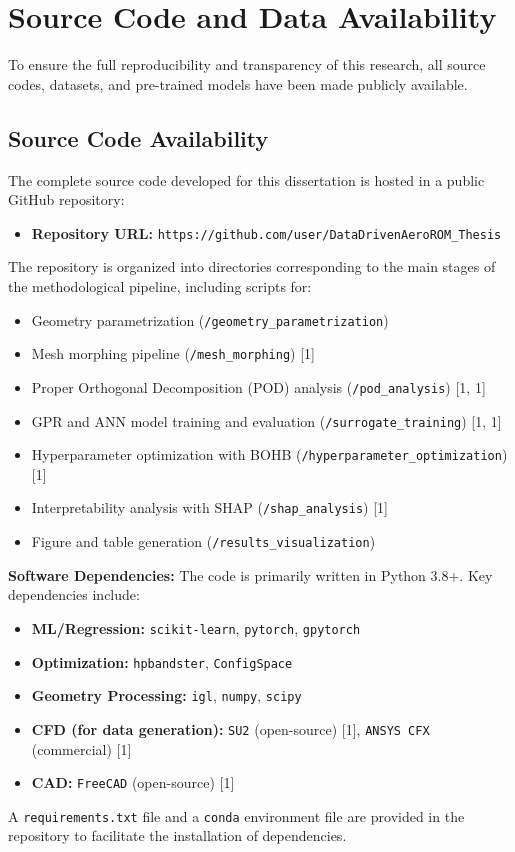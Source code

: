 \documentclass[dsc, EN]{ufabcFHZh}
\begin{document}
\chapter{Source Code and Data Availability}
\label{app:code_data}

To ensure the full reproducibility and transparency of this research, all source codes, datasets, and pre-trained models have been made publicly available.

\section{Source Code Availability}
\label{sec:code_availability}

The complete source code developed for this dissertation is hosted in a public GitHub repository:
\begin{itemize}
    \item \textbf{Repository URL:} \texttt{https://github.com/user/DataDrivenAeroROM\_Thesis}
\end{itemize}
The repository is organized into directories corresponding to the main stages of the methodological pipeline, including scripts for:
\begin{itemize}
    \item Geometry parametrization (\texttt{/geometry\_parametrization})
    \item Mesh morphing pipeline (\texttt{/mesh\_morphing}) {[1]}
    \item Proper Orthogonal Decomposition (POD) analysis (\texttt{/pod\_analysis}) {[1, 1]}
    \item GPR and ANN model training and evaluation (\texttt{/surrogate\_training}) {[1, 1]}
    \item Hyperparameter optimization with BOHB (\texttt{/hyperparameter\_optimization}) {[1]}
    \item Interpretability analysis with SHAP (\texttt{/shap\_analysis}) {[1]}
    \item Figure and table generation (\texttt{/results\_visualization})
\end{itemize}

\noindent\textbf{Software Dependencies:}
The code is primarily written in Python 3.8+. Key dependencies include:
\begin{itemize}
    \item \textbf{ML/Regression:} \texttt{scikit-learn}, \texttt{pytorch}, \texttt{gpytorch}
    \item \textbf{Optimization:} \texttt{hpbandster}, \texttt{ConfigSpace}
    \item \textbf{Geometry Processing:} \texttt{igl}, \texttt{numpy}, \texttt{scipy}
    \item \textbf{CFD (for data generation):} \texttt{SU2} (open-source) {[1]}, \texttt{ANSYS CFX} (commercial) {[1]}
    \item \textbf{CAD:} \texttt{FreeCAD} (open-source) {[1]}
\end{itemize}
A \texttt{requirements.txt} file and a \texttt{conda} environment file are provided in the repository to facilitate the installation of dependencies.
\end{document}
